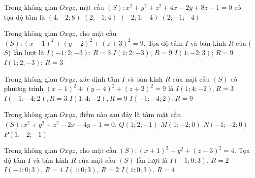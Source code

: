 \begin{ex}%
	Trong không  gian $Oxyz$, mặt cầu $(S) \colon x^2+y^2+z^2+4x-2y+8z-1=0$ có tọa độ tâm là
	\choice 
		{$(4;-2;8)$} 
		{$(2;-1;4)$} 
		{\True $(-2;1;-4)$} 
		 {$(2;-1;-4)$}
\end{ex}

\begin{ex}%
	Trong không gian $Oxyz$, cho mặt cầu $(S)\colon (x-1)^2+(y-2)^2+(z+3)^2=9$. Tọa độ tâm $I$ và bán  kính $R$ của ($S$) lần lượt là
	 \choice
		{$I(-1;2;-3)$; $R=3$} 
		 {$I(1;2;-3)$; $R=9$}
		{$I(1;-2;3)$; $R=9$} 
		{\True  $I(1;2;-3)$; $R=3$}
\end{ex}

\begin{ex}%
	Trong không gian $Oxyz$, xác định tâm $I$ và bán kính $R$ của mặt cầu $(S)$ có phương trình $(x-1)^2+(y-4)^2+(z+2)^2=9$ là 
	 \choice
		{\True  $I(1;4;-2),R = 3$}
		{$I(-1;-4;2),R  = 3$}
		{$I(1;4;-2),R = 9$} 
		{$I(-1;-4;2),R = 9$} 
\end{ex}

\begin{ex}%
	Trong không gian $Oxyz$, điểm nào  sau đây là tâm mặt cầu $(S)\colon x^{2}+y^{2}+z^{2}-2 x+4 y-1=0$.
	 \choice
		{$Q(1;  2;-1)$}
		{\True  $M(1;-2; 0)$}
		{$N(-1;-2; 0)$} 
		{$P(1;-2;-1)$} 
\end{ex}

\begin{ex}%
	 Trong không gian $Oxyz$, cho mặt cầu $(S)\colon (x+1)^2+y^2+(z-3)^2=4$. Tọa độ tâm $I$ và bán kính $R$ của mặt cầu $(S)$ lần lượt là
	\choice 
		 {\True $I(-1;0;3)$, $R=2$}
		 {$I(-1;0;3)$, $R=4$}
		{$I(1;0;3)$,  $R=2$}
		 {$I(1;0;3)$, $R=4$}
\end{ex}

